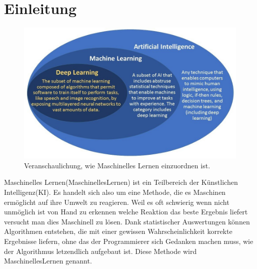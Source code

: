 \documentclass{thesisclass}
\begin{document}
\section{\textbf{Einleitung}}
\begin{figure}[h!]
  \center
  \includegraphics[width=\textwidth]{images/machineLearningInAI.jpg}
  \caption{Veranschaulichung, wie Maschinelles Lernen einzuordnen ist. \cite{machineLearning1}}
  \label{fig:Veranschaulichung, wie Maschinelles Lernen einzuordnen ist.}
\end{figure}

Maschinelles Lernen(\gls{MaschinellesLernen}) ist ein Teilbereich der K\"unstlichen Intelligenz(\gls{KI}). Es handelt sich also um eine Methode, die es Maschinen erm\"oglicht auf ihre Umwelt zu reagieren. Weil es oft schwierig wenn nicht unm\"oglich ist von Hand zu erkennen welche Reaktion das beste Ergebnis liefert versucht man dies Maschinell zu lösen. Dank statistischer Auswertungen k\"onnen Algorithmen entstehen, die mit einer gewissen Wahrscheinlichkeit korrekte Ergebnisse liefern, ohne das der Programmierer sich Gedanken machen muss, wie der Algorithmus letzendlich aufgebaut ist. Diese Methode wird \gls{MaschinellesLernen} genannt.\newline
\end{document}
